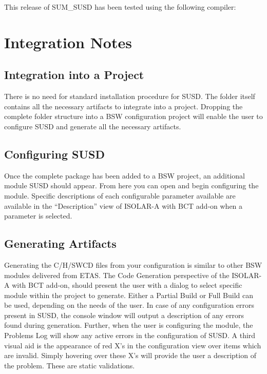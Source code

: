 This release of SUM\_SUSD has been tested using the following compiler:



\section{Integration Notes}

\subsection{Integration into a Project}
There is no need for standard installation procedure for SUSD.
The folder itself contains all the necessary artifacts to integrate into a project.
Dropping the complete folder structure into a BSW configuration project will enable the user to configure SUSD and generate all the necessary artifacts.

\subsection{Configuring SUSD}
Once the complete package has been added to a BSW project, an additional module SUSD should appear.
From here you can open and begin configuring the module.
Specific descriptions of each configurable parameter available are available in the “Description” view of ISOLAR-A with BCT add-on when a parameter is selected.

\subsection{Generating Artifacts}
Generating the C/H/SWCD files from your configuration is similar to other BSW modules delivered from ETAS.
The Code Generation perspective of the ISOLAR-A with BCT add-on, should present the user with a dialog to select specific module within the project to generate.
Either a Partial Build or Full Build can be used, depending on the needs of the user.
In case of any configuration errors present in SUSD, the console window will output a description of any errors found during generation.
Further, when the user is configuring the module, the Problems Log will show any active errors in the configuration of SUSD.
A third visual aid is the appearance of red X’s in the configuration view over items which are invalid.
Simply hovering over these X’s will provide the user a description of the problem.
These are static validations.

